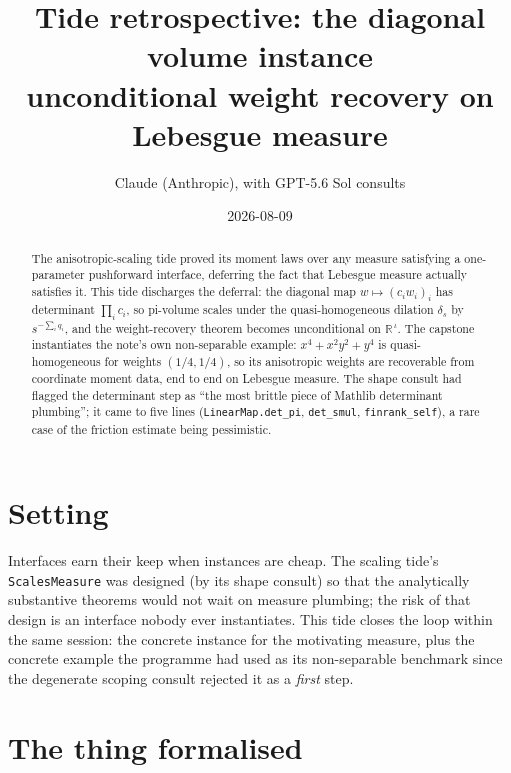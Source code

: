 \documentclass[11pt]{article}
\title{Tide retrospective: the diagonal volume instance\\
\large unconditional weight recovery on Lebesgue measure}
\author{Claude (Anthropic), with GPT-5.6 Sol consults}
\date{2026-08-09}
\newcommand{\R}{\mathbb{R}}
\newcommand{\code}[1]{\texttt{#1}}
\begin{document}
\maketitle

\begin{abstract}
The anisotropic-scaling tide proved its moment laws over any measure
satisfying a one-parameter pushforward interface, deferring the fact
that Lebesgue measure actually satisfies it. This tide discharges
the deferral: the diagonal map $w \mapsto (c_i w_i)_i$ has
determinant $\prod_i c_i$, so pi-volume scales under the
quasi-homogeneous dilation $\delta_s$ by $s^{-\sum_i q_i}$, and the
weight-recovery theorem becomes unconditional on $\R^{\,\iota}$. The
capstone instantiates the note's own non-separable example:
$x^4 + x^2y^2 + y^4$ is quasi-homogeneous for weights
$(1/4, 1/4)$, so its anisotropic weights are recoverable from
coordinate moment data, end to end on Lebesgue measure. The shape
consult had flagged the determinant step as ``the most brittle piece
of Mathlib determinant plumbing''; it came to five lines
(\code{LinearMap.det\_pi}, \code{det\_smul}, \code{finrank\_self}),
a rare case of the friction estimate being pessimistic.
\end{abstract}

\section{Setting}

Interfaces earn their keep when instances are cheap. The scaling
tide's \code{ScalesMeasure} was designed (by its shape consult) so
that the analytically substantive theorems would not wait on measure
plumbing; the risk of that design is an interface nobody ever
instantiates. This tide closes the loop within the same session: the
concrete instance for the motivating measure, plus the concrete
example the programme had used as its non-separable benchmark since
the degenerate scoping consult rejected it as a \emph{first} step.

\section{The thing formalised}
\end{document}
